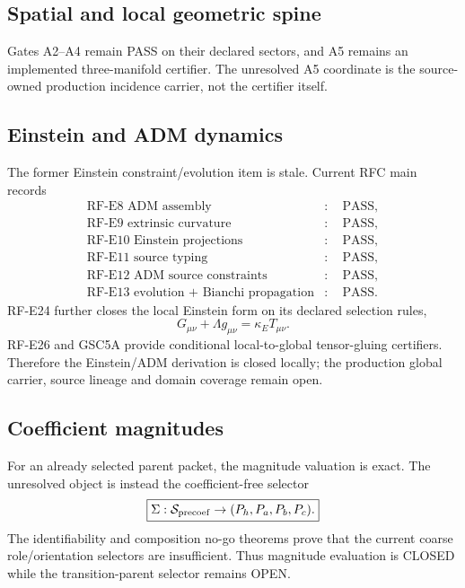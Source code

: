 \subsection{Spatial and local geometric spine}

Gates A2--A4 remain PASS on their declared sectors, and A5 remains an
implemented three-manifold certifier. The unresolved A5 coordinate is the
source-owned production incidence carrier, not the certifier itself.

\subsection{Einstein and ADM dynamics}

The former Einstein constraint/evolution item is stale. Current RFC main records
\[
\boxed{
\begin{aligned}
\text{RF-E8 ADM assembly} &:\quad \mathrm{PASS},\\
\text{RF-E9 extrinsic curvature} &:\quad \mathrm{PASS},\\
\text{RF-E10 Einstein projections} &:\quad \mathrm{PASS},\\
\text{RF-E11 source typing} &:\quad \mathrm{PASS},\\
\text{RF-E12 ADM source constraints} &:\quad \mathrm{PASS},\\
\text{RF-E13 evolution + Bianchi propagation} &:\quad \mathrm{PASS}.
\end{aligned}}
\]
RF-E24 further closes the local Einstein form on its declared selection rules,
\[
\boxed{
G_{\mu\nu}+\Lambda g_{\mu\nu}
=\kappa_E T_{\mu\nu}.
}
\]
RF-E26 and GSC5A provide conditional local-to-global tensor-gluing certifiers.
Therefore the Einstein/ADM derivation is closed locally; the production global
carrier, source lineage and domain coverage remain open.

\subsection{Coefficient magnitudes}

For an already selected parent packet, the magnitude valuation is exact.
The unresolved object is instead the coefficient-free selector
\[
\boxed{
\Sigma:\mathcal S_{\rm precoef}\to(P_h,P_a,P_b,P_c).
}
\]
The identifiability and composition no-go theorems prove that the current coarse
role/orientation selectors are insufficient. Thus magnitude evaluation is
CLOSED while the transition-parent selector remains OPEN.

